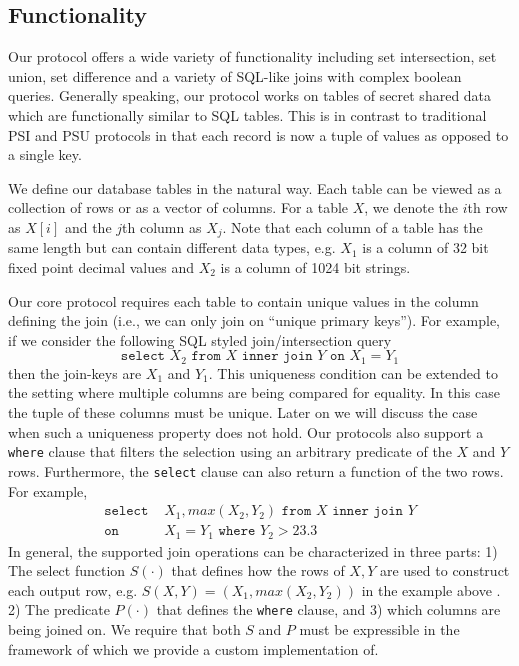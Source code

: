 \subsection{Functionality}

Our protocol offers a wide variety of functionality including set intersection, set union, set difference and a variety of SQL-like joins with complex boolean queries. Generally speaking, our protocol works on tables of secret shared data which are functionally similar to SQL tables. This is in contrast to traditional PSI and PSU protocols\cite{usenix:PSZ14,USENIX:PSSZ15,PSZ16,CCS:KKRT16} in that each record is now a tuple of values as opposed to a single key. 

We define our database tables in the natural way. Each table can be viewed as a collection of rows or as a vector of columns. For a table $X$, we denote the $i$th row as $X[i]$ and the $j$th column as $X_j$. 
\iffullversion
Note that each column of a table has the same length but can contain different data types, e.g. $X_1$ is a column of 32 bit fixed point decimal values and $X_2$ is a column of 1024 bit strings.

\fi
Our core protocol requires each table to contain unique values in the column defining the join  (i.e., we can only join on ``unique primary keys''). For example, if we consider the following SQL styled join/intersection query
$$
\texttt{select } X_2 \texttt{ from } X \texttt{ inner join } Y \texttt{ on } X_1 = Y_1
$$
then the join-keys are $X_1$ and $Y_1$. This uniqueness condition can be extended to the setting where multiple columns are being compared for equality. 
\iffullversion
In this case the tuple of these columns must be unique. 
\fi
Later on we will discuss the case when such a uniqueness property does not hold. Our protocols also support a \texttt{where} clause that filters the selection using an arbitrary predicate of the $X$ and $Y$ rows. Furthermore, the \texttt{select} clause can also return a function of the two rows. For example,
\begin{align*}
\texttt{select }&  X_1,max(X_2, Y_2)  \texttt{ from } X \texttt{ inner join } Y \\
\texttt{on }& X_1 = Y_1 \texttt{ where } Y_2 > 23.3
\end{align*}
In general, the supported join operations can be characterized in three parts: 1) The select function $S(\cdot)$ that defines how the rows of $X,Y$ are used to construct each output row, e.g. $S(X,Y)=(X_1, max(X_2,Y_2))$
\iffullversion
in the example above
\fi. 2) The predicate $P(\cdot)$ that defines the \texttt{where} clause, and 3) which columns are being joined on.
\iffullversion
 We require that both $S$ and $P$ must be expressible in the framework of \cite{aby3} which we provide a custom implementation of.
\fi

